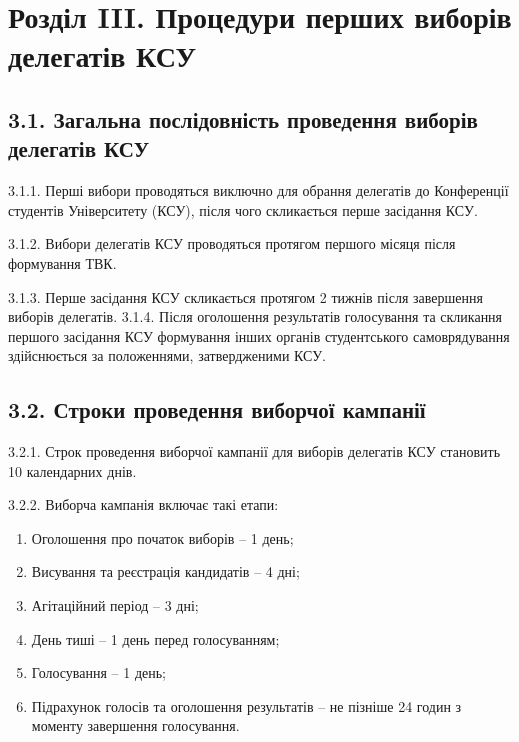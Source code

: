 \section*{Розділ III. Процедури перших виборів делегатів КСУ}

\subsection*{3.1. Загальна послідовність проведення виборів делегатів КСУ}
    3.1.1. Перші вибори проводяться виключно для обрання делегатів до Конференції студентів Університету (КСУ), після чого скликається перше засідання КСУ.

    3.1.2. Вибори делегатів КСУ проводяться протягом першого місяця після формування ТВК.

    3.1.3. Перше засідання КСУ скликається протягом 2 тижнів після завершення виборів делегатів.
    3.1.4. Після оголошення результатів голосування та скликання першого засідання КСУ формування інших органів студентського самоврядування здійснюється за положеннями, затвердженими КСУ.

\subsection*{3.2. Строки проведення виборчої кампанії}
    3.2.1. Строк проведення виборчої кампанії для виборів делегатів КСУ становить 10 календарних днів.

    3.2.2. Виборча кампанія включає такі етапи:

        \begin{enumerate}[label=\alph*)]
            \item Оголошення про початок виборів -- 1 день;
            \item Висування та реєстрація кандидатів -- 4 дні;
            \item Агітаційний період -- 3 дні;
            \item День тиші -- 1 день перед голосуванням;
            \item Голосування -- 1 день;
            \item Підрахунок голосів та оголошення результатів -- не пізніше 24 годин з моменту завершення голосування.
        \end{enumerate}

